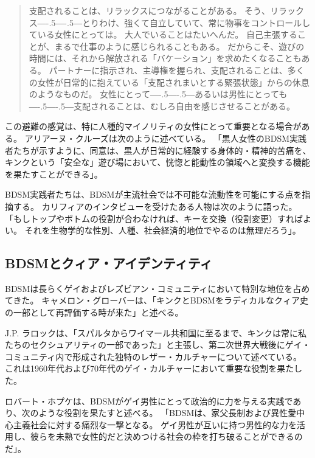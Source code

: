 \documentclass[paper=a4,book,openany]{jlreq}
\def\DDASH{―\kern-.5\zw―\kern-.5\zw―} %
\begin{document}
\begin{quote}
  支配されることは、リラックスにつながることがある。
そう、リラックス{\DDASH}とりわけ、強くて自立していて、常に物事をコントロールしている女性にとっては。
大人でいることはたいへんだ。
自己主張することが、まるで仕事のように感じられることもある。
だからこそ、遊びの時間には、それから解放される「バケーション」を求めたくなることもある。
パートナーに指示され、主導権を握られ、支配されることは、多くの女性が日常的に抱えている「支配されまいとする緊張状態」からの休息のようなものだ。
女性にとって{\DDASH}あるいは男性にとっても{\DDASH}支配されることは、むしろ自由を感じさせることがある。
\citep{cicero12:_six_myths_kink_bdsm}
\end{quote}

この避難の感覚は、特に人種的マイノリティの女性にとって重要となる場合がある。
アリアーヌ・クルーズは次のように述べている。
「黒人女性のBDSM実践者たちが示すように、同意は、黒人が日常的に経験する身体的・精神的苦痛を、キンクという「安全な」遊び場において、恍惚と能動性の領域へと変換する機能を果たすことができる」\citep{wachter-grene16:_conver_arian_cruz}。

BDSM実践者たちは、BDSMが主流社会では不可能な流動性を可能にする点を指摘する。
カリフィアのインタビューを受けたある人物は次のように語った。
「もしトップやボトムの役割が合わなければ、キーを交換（役割変更）すればよい。
それを生物学的な性別、人種、社会経済的地位でやるのは無理だろう」\citep[pp.173-174]{califia00:_public_sex}。

\subsection{BDSMとクィア・アイデンティティ}

BDSMは長らくゲイおよびレズビアン・コミュニティにおいて特別な地位を占めてきた。
キャメロン・グローバーは、「キンクとBDSMをラディカルなクィア史の一部として再評価する時が来た」と述べる\citep{glover18:_its_time_recen_kink_bdsm}。

J.P. ラロックは、「スパルタからワイマール共和国に至るまで、キンクは常に私たちのセクシュアリティの一部であった」と主張し、第二次世界大戦後にゲイ・コミュニティ内で形成された独特のレザー・カルチャーについて述べている。
これは1960年代および70年代のゲイ・カルチャーにおいて重要な役割を果たした\citep{larocque14:_brief_histor_bdsm}。

ロバート・ホプケは、BDSMがゲイ男性にとって政治的に力を与える実践であり、次のような役割を果たすと述べる。
「BDSMは、家父長制および異性愛中心主義社会に対する痛烈な一撃となる。
ゲイ男性が互いに持つ男性的な力を活用し、彼らを未熟で女性的だと決めつける社会の枠を打ち破ることができるのだ」\citep[p.71]{hopcke91:_jung_jungian_homos}。
\end{document}
